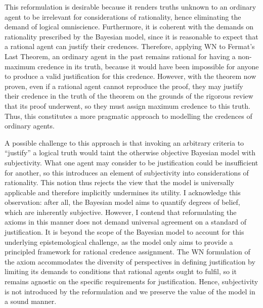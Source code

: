 \documentclass[12pt]{article}
\begin{document}
This reformulation is desirable because it renders truths unknown to an ordinary agent to be irrelevant for considerations of rationality, hence eliminating the demand of logical omniscience. Furthermore, it is coherent with the demands on rationality prescribed by the Bayesian model, since it is reasonable to expect that a rational agent can justify their credences. Therefore, applying WN to Fermat's Last Theorem, an ordinary agent in the past remains rational for having a non-maximum credence in its truth, because it would have been impossible for anyone to produce a valid justification for this credence. However, with the theorem now proven, even if a rational agent cannot reproduce the proof, they may justify their credence in the truth of the theorem on the grounds of the rigorous review that its proof underwent, so they must assign maximum credence to this truth. Thus, this constitutes a more pragmatic approach to modelling the credences of ordinary agents.

A possible challenge to this approach is that invoking an arbitrary criteria to ``justify'' a logical truth would taint the otherwise objective Bayesian model with subjectivity. What one agent may consider to be justification could be insufficient for another, so this introduces an element of subjectivity into considerations of rationality. This notion thus rejects the view that the model is universally applicable and therefore implicitly undermines its utility. I acknowledge this observation: after all, the Bayesian model aims to quantify degrees of belief, which are inherently subjective. However, I contend that reformulating the axioms in this manner does not demand universal agreement on a standard of justification. It is beyond the scope of the Bayesian model to account for this underlying epistemological challenge, as the model only aims to provide a principled framework for rational credence assignment. The WN formulation of the axiom accommodates the diversity of perspectives in defining justification by limiting its demands to conditions that rational agents ought to fulfil, so it remains agnostic on the specific requirements for justification. Hence, subjectivity is not introduced by the reformulation and we preserve the value of the model in a sound manner.
\end{document}
